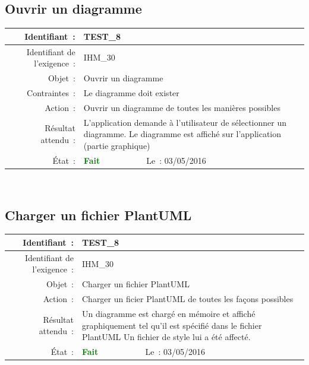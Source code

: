 \documentclass[hidelinks, a4paper,11pt,twoside,final]{article}
\begin{document}
    \subsection*{Ouvrir un diagramme}
    \begin{tabular}{|r|p{5cm}|p{5cm}|}\hline
    {Identifiant~:} & \multicolumn{2}{|p{10cm}|}{TEST\_8} \\\hline
    {Identifiant de l’exigence~:} & \multicolumn{2}{|p{10cm}|}{IHM\_30} \\\hline
        {Objet~:} & \multicolumn{2}{|p{10cm}|}{Ouvrir un diagramme} \\\hline
        {Contraintes~:} & \multicolumn{2}{|p{10cm}|}{Le diagramme doit exister} \\\hline
        {Action~:} & \multicolumn{2}{|p{10cm}|}{Ouvrir un diagramme de toutes les manières possibles} \\\hline
        {Résultat attendu~:} & \multicolumn{2}{|p{10cm}|}{L’application demande à l’utilisateur de sélectionner un diagramme.
                              Le diagramme est affiché sur l’application (partie graphique)} \\\hline
        {État~:} & {\textcolor{green}{\textbf{Fait}}} & {Le~: 03/05/2016 } \\\hline
    \end{tabular}
    \\
    \newline
    
     \subsection*{Charger un fichier PlantUML}
    \begin{tabular}{|r|p{5cm}|p{5cm}|}\hline
    {Identifiant~:} & \multicolumn{2}{|p{10cm}|}{TEST\_8} \\\hline
    {Identifiant de l’exigence~:} & \multicolumn{2}{|p{10cm}|}{IHM\_30} \\\hline
        {Objet~:} & \multicolumn{2}{|p{10cm}|}{Charger un fichier PlantUML} \\\hline
        {Action~:} & \multicolumn{2}{|p{10cm}|}{Charger un ficier PlantUML de toutes les façons possibles} \\\hline
        {Résultat attendu~:} & \multicolumn{2}{|p{10cm}|}{Un diagramme est chargé en mémoire et affiché graphiquement tel qu’il est spécifié dans le fichier PlantUML
        Un fichier de style lui a été affecté.} \\\hline
        {État~:} & {\textcolor{green}{\textbf{Fait}}} & {Le~: 03/05/2016 } \\\hline
    \end{tabular}
    \\
    \newline
    
\end{document}
